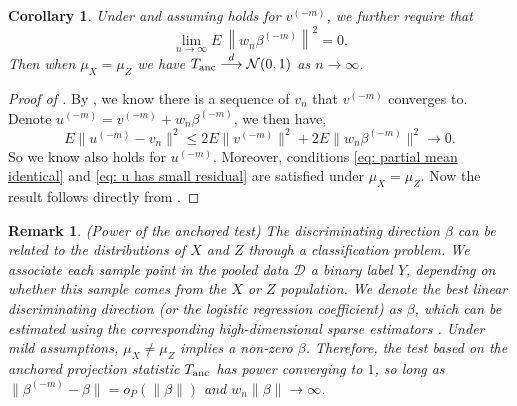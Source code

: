 \documentclass[11pt]{article}
\newtheorem{corollary}[theorem]{Corollary}
\newtheorem{remark}{Remark}[section]
\begin{document}
\begin{corollary}
\label{corollary: anchored Lasso}
     Under  and assuming  holds for $v^{(-m)}$, we further require that
\begin{equation}\label{eq: classifier_quality}
         \lim_{n\rightarrow\infty}E\ \left\|w_n \beta^{(-m)}\right\|^2 = 0.
     \end{equation}
      Then when $\mu_X = \mu_Z$ we have $T_{\rm anc} \stackrel{d}{\longrightarrow} \mathcal{N}(0,1)$ as $n \rightarrow \infty$.
\end{corollary}

\begin{proof}[Proof of ]
By , we know there is a sequence of $v_n$ that $v^{(-m)}$ converges to. Denote $u^{(-m)} = v^{(-m)}+w_n \beta^{(-m)}$, we then have,
\begin{equation*}
    E\|u^{(-m)} - v_n\|^2 \leq 2E\|v^{(-m)}\|^2 + 2E\|w_n \beta^{(-m)}\|^2 \rightarrow 0.
\end{equation*}
So we know  also holds for $u^{(-m)}$. Moreover, conditions \eqref{eq: partial mean identical} and \eqref{eq: u has small residual} are satisfied under $\mu_X = \mu_Z$. Now the result follows directly from .
\end{proof}

\begin{remark}(Power of the anchored test)
The discriminating direction $\beta$ can be related to the distributions of $X$ and $Z$ through a classification problem. We associate each sample point in the pooled data $\mathcal{D}$ a binary label  $Y$, depending on whether this sample comes from the $X$ or $Z$ population. We denote the best linear discriminating direction (or the logistic regression coefficient) as $\beta$, which can be estimated using the corresponding high-dimensional sparse estimators \citep{van2008high,cai2011direct}.
Under mild assumptions, $\mu_X \neq \mu_Z$ implies a non-zero $\beta$. 
Therefore, the test based on the anchored projection statistic $T_{\rm anc}$ has power converging to $1$, so long as $\|\beta^{(-m)}-\beta\|=o_P(\|\beta\|)$ and $w_n\|\beta\|\rightarrow \infty$.
\end{remark}
\end{document}
